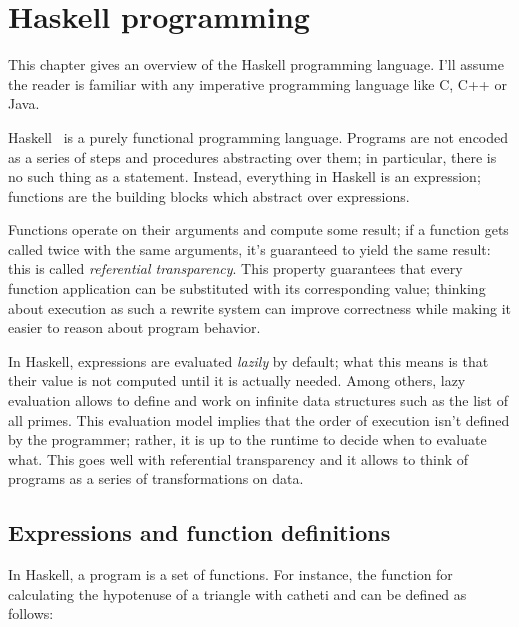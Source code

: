 \documentclass[UdineBachThesis,american,11pt]{PhdThesis}
\begin{document}
  \frontmatter

  \tableofcontents

  \mainmatter

  \pagestyle{serif}

  \chapter{Haskell programming}

  This chapter gives an overview of the Haskell programming language. I'll
  assume the reader is familiar with any imperative programming language like C,
  C++ or Java.

  Haskell~\autocite{haskell} is a purely functional programming language. Programs
  are not encoded as a series of steps and procedures abstracting over them; in
  particular, there is no such thing as a statement. Instead, everything in
  Haskell is an expression; functions are the building blocks which abstract
  over expressions.

  Functions operate on their arguments and compute some result; if a function
  gets called twice with the same arguments, it's guaranteed to yield the same
  result: this is called \emph{referential transparency}. This property
  guarantees that every function application can be substituted with its
  corresponding value; thinking about execution as such a rewrite system can
  improve correctness while making it easier to reason about program behavior.

  In Haskell, expressions are evaluated \emph{lazily} by default; what this
  means is that their value is not computed until it is actually needed. Among
  others, lazy evaluation allows to define and work on infinite data structures
  such as the list of all primes. This evaluation model implies that the order
  of execution isn't defined by the programmer; rather, it is up to the runtime
  to decide when to evaluate what. This goes well with referential transparency
  and it allows to think of programs as a series of transformations on data.

  \section{Expressions and function definitions}

  In Haskell, a program is a set of functions. For instance, the function for
  calculating the hypotenuse of a triangle with catheti \lstinline@x@ and
  \lstinline@y@ can be defined as follows:
\end{document}
